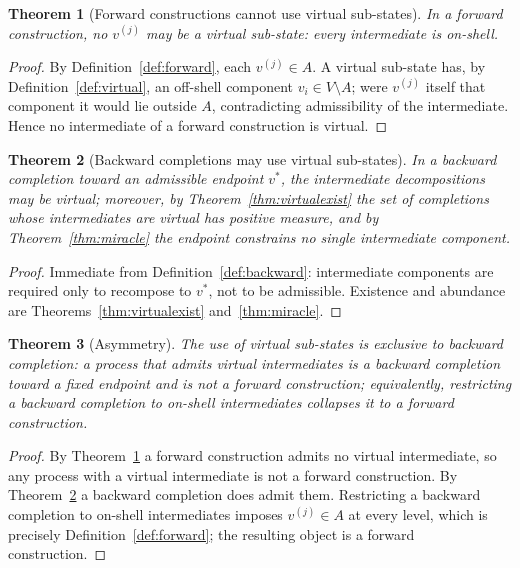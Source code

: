 \documentclass[11pt,a4paper]{article}
\theoremstyle{thmstyle}
\newtheorem{theorem}{Theorem}[section]
\theoremstyle{definition}
\theoremstyle{remark}
\begin{document}
\begin{theorem}[Forward constructions cannot use virtual sub-states]
\label{thm:forwardnovirtual}
In a forward construction, no $v^{(j)}$ may be a virtual sub-state: every
intermediate is on-shell.
\end{theorem}

\begin{proof}
By Definition~\ref{def:forward}, each $v^{(j)}\in A$. A virtual sub-state
has, by Definition~\ref{def:virtual}, an off-shell component
$v_i\in V\setminus A$; were $v^{(j)}$ itself that component it would lie
outside $A$, contradicting admissibility of the intermediate. Hence no
intermediate of a forward construction is virtual.
\end{proof}

\begin{theorem}[Backward completions may use virtual sub-states]
\label{thm:backwardvirtual}
In a backward completion toward an admissible endpoint $v^{\ast}$, the
intermediate decompositions may be virtual; moreover, by
Theorem~\ref{thm:virtualexist} the set of completions whose intermediates
are virtual has positive measure, and by Theorem~\ref{thm:miracle} the
endpoint constrains no single intermediate component.
\end{theorem}

\begin{proof}
Immediate from Definition~\ref{def:backward}: intermediate components are
required only to recompose to $v^{\ast}$, not to be admissible. Existence
and abundance are Theorems~\ref{thm:virtualexist} and~\ref{thm:miracle}.
\end{proof}

\begin{theorem}[Asymmetry]
\label{thm:asymmetry}
The use of virtual sub-states is exclusive to backward completion: a
process that admits virtual intermediates is a backward completion toward a
fixed endpoint and is not a forward construction; equivalently, restricting
a backward completion to on-shell intermediates collapses it to a forward
construction.
\end{theorem}

\begin{proof}
By Theorem~\ref{thm:forwardnovirtual} a forward construction admits no
virtual intermediate, so any process with a virtual intermediate is not a
forward construction. By Theorem~\ref{thm:backwardvirtual} a backward
completion does admit them. Restricting a backward completion to on-shell
intermediates imposes $v^{(j)}\in A$ at every level, which is precisely
Definition~\ref{def:forward}; the resulting object is a forward
construction.
\end{proof}
\end{document}

